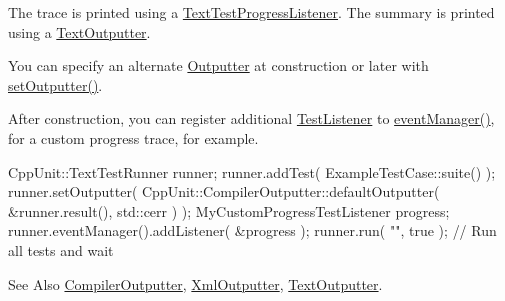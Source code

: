 The trace is printed using a \hyperlink{class_text_test_progress_listener}{Text\-Test\-Progress\-Listener}. The summary is printed using a \hyperlink{class_text_outputter}{Text\-Outputter}.

You can specify an alternate \hyperlink{class_outputter}{Outputter} at construction or later with \hyperlink{class_text_test_runner_a9d62d11f3acba355e47d21cb99106117}{set\-Outputter()}.

After construction, you can register additional \hyperlink{class_test_listener}{Test\-Listener} to \hyperlink{class_text_test_runner_afa50f45ea60892db3cf0b128c06a1629}{event\-Manager()}, for a custom progress trace, for example.


\begin{DoxyCode}
CppUnit::TextTestRunner runner;
runner.addTest( ExampleTestCase::suite() );
runner.setOutputter( CppUnit::CompilerOutputter::defaultOutputter( 
                         &runner.result(),
                         std::cerr ) );
MyCustomProgressTestListener progress;
runner.eventManager().addListener( &progress );
runner.run( \textcolor{stringliteral}{""}, \textcolor{keyword}{true} );    \textcolor{comment}{// Run all tests and wait}
\end{DoxyCode}


\begin{DoxySeeAlso}{See Also}
\hyperlink{class_compiler_outputter}{Compiler\-Outputter}, \hyperlink{class_xml_outputter}{Xml\-Outputter}, \hyperlink{class_text_outputter}{Text\-Outputter}. 
\end{DoxySeeAlso}


